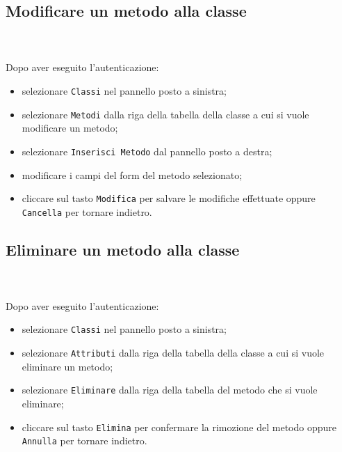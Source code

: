 	\subsection{Modificare un metodo alla classe} \mbox{}\\ \mbox{}\\
	Dopo aver eseguito l'autenticazione:
	\begin{itemize}
		\item selezionare \texttt{Classi} nel pannello posto a sinistra;
		\item selezionare \texttt{Metodi} dalla riga della tabella della classe
		a cui si vuole modificare un metodo;
		\item selezionare \texttt{Inserisci Metodo} dal pannello posto a destra;
		\item modificare i campi del form del metodo selezionato;
		\item cliccare sul tasto \texttt{Modifica} per salvare le modifiche 
		effettuate
		oppure \texttt{Cancella} per tornare indietro.	
	\end{itemize}
	
	\subsection{Eliminare un metodo alla classe} \mbox{}\\ \mbox{}\\
	Dopo aver eseguito l'autenticazione:
	\begin{itemize}
		\item selezionare \texttt{Classi} nel pannello posto a sinistra;
		\item selezionare \texttt{Attributi} dalla riga della tabella della 
		classe
		a cui si vuole eliminare un metodo;\
		\item selezionare \texttt{Eliminare} dalla riga della tabella del metodo
		che si vuole eliminare;
		\item cliccare sul tasto \texttt{Elimina} per confermare la rimozione 
		del metodo
		oppure \texttt{Annulla} per tornare indietro.
	\end{itemize}
	
